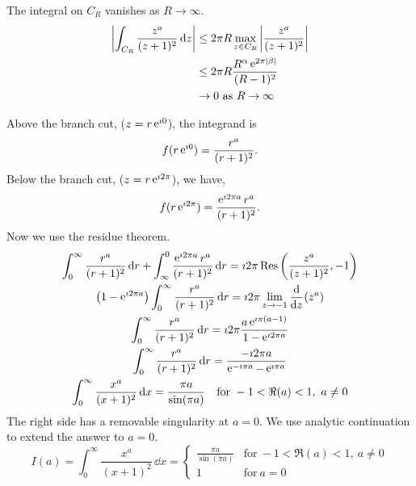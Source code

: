 {\begin{Solution}
  The integral on $C_R$ vanishes as $R \to \infty$.
  \begin{align*}
    \left| \int_{C_R} \frac{z^a}{(z+1)^2}\,\mathrm{d} z \right|
    &\leq 2 \pi R \max_{z \in C_R} \left|
      \frac{z^a}{(z+1)^2} \right| \\
    &\leq 2 \pi R \frac{ R^\alpha \mathop{\mathrm{e}}\nolimits^{2 \pi |\beta|} }{(R-1)^2} \\
    &\to 0\ \mathrm{as}\ R \to \infty
  \end{align*}

  Above the branch cut, ($z = r \mathop{\mathrm{e}}\nolimits^{\imath 0}$), the integrand is
  \[
  f(r \mathop{\mathrm{e}}\nolimits^{\imath 0}) = \frac{r^a}{(r+1)^2}.
  \]
  Below the branch cut, ($z = r \mathop{\mathrm{e}}\nolimits^{\imath 2 \pi}$), we have,
  \[
  f(r \mathop{\mathrm{e}}\nolimits^{\imath 2 \pi}) = \frac{\mathop{\mathrm{e}}\nolimits^{\imath 2 \pi a} r^a}{(r+1)^2}.
  \]
  Now we use the residue theorem. 
  \begin{gather*}
    \int_0^\infty \frac{r^a}{(r+1)^2} \,\mathrm{d} r 
    + \int_\infty^0 \frac{\mathop{\mathrm{e}}\nolimits^{\imath 2 \pi a} r^a}{(r+1)^2}\,\mathrm{d} r
    = \imath 2 \pi \mathop{\mathrm{Res}}\nolimits \left( \frac{z^a}{(z+1)^2}, -1 \right) \\
    \left( 1 - \mathop{\mathrm{e}}\nolimits^{\imath 2 \pi a} \right) \int_0^\infty \frac{r^a}{(r+1)^2} \,\mathrm{d} r 
    = \imath 2 \pi \lim_{z \to -1}  \frac{\mathrm{d}}{\mathrm{d} z} (z^a) \\
    \int_0^\infty \frac{r^a}{(r+1)^2} \,\mathrm{d} r 
    = \imath 2 \pi \frac{a \mathop{\mathrm{e}}\nolimits^{\imath \pi (a-1)}}{ 1 - \mathop{\mathrm{e}}\nolimits^{\imath 2 \pi a} } \\
    \int_0^\infty \frac{r^a}{(r+1)^2} \,\mathrm{d} r 
    = \frac{- \imath 2 \pi a }{ \mathop{\mathrm{e}}\nolimits^{- \imath \pi a}  - \mathop{\mathrm{e}}\nolimits^{\imath \pi a} } \\
    \int_0^\infty \frac{x^a}{(x+1)^2} \,\mathrm{d} x = \frac{ \pi a }{ \sin(\pi a) }
    \quad \mathrm{for}\ -1 < \Re(a) < 1,\ a \neq 0
  \end{gather*}
  The right side has a removable singularity at $a = 0$.  We use analytic
  continuation to extend the answer to $a = 0$.
  \[
  \boxed{
    I(a) = \int_0^\infty \frac{x^a}{(x+1)^2} \,\dd x = 
    \begin{cases}
      \frac{ \pi a }{ \sin(\pi a) } &\mathrm{for}\ -1 < \Re(a) < 1,\ a \neq 0 \\
      1 &\mathrm{for}\ a = 0
    \end{cases}
    }
  \]



\end{Solution}}
